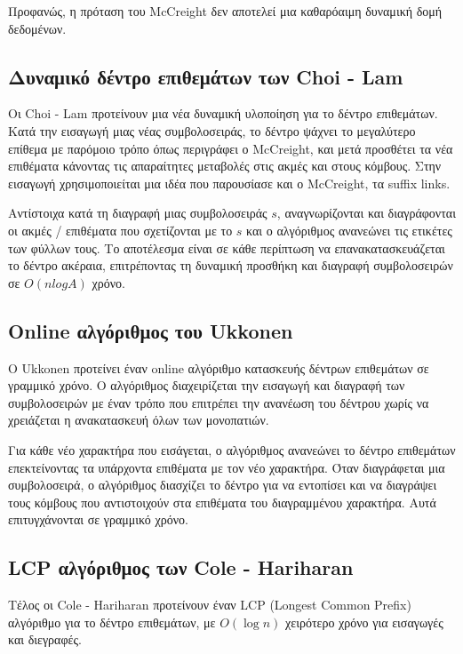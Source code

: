             Προφανώς, η πρόταση του McCreight δεν αποτελεί μια καθαρόαιμη δυναμική δομή δεδομένων.

        \subsection{Δυναμικό δέντρο επιθεμάτων των Choi - Lam}
            Οι Choi - Lam προτείνουν μια νέα δυναμική υλοποίηση για το δέντρο επιθεμάτων. \cite{Choi_Lam_1997}
            Κατά την εισαγωγή μιας νέας συμβολοσειράς, το δέντρο ψάχνει το μεγαλύτερο επίθεμα με παρόμοιο τρόπο όπως περιγράφει ο McCreight, και μετά προσθέτει τα νέα επιθέματα κάνοντας τις απαραίτητες μεταβολές στις ακμές και στους κόμβους.
            Στην εισαγωγή χρησιμοποιείται μια ιδέα που παρουσίασε και ο McCreight, τα suffix links.

            Αντίστοιχα κατά τη διαγραφή μιας συμβολοσειράς \(s\), αναγνωρίζονται και διαγράφονται οι ακμές / επιθέματα που σχετίζονται με το \(s\) και ο αλγόριθμος ανανεώνει τις ετικέτες των φύλλων τους.
            Το αποτέλεσμα είναι σε κάθε περίπτωση να επανακατασκευάζεται το δέντρο ακέραια, επιτρέποντας τη δυναμική προσθήκη και διαγραφή συμβολοσειρών σε \(O(nlogA)\) χρόνο.

        \subsection{Online αλγόριθμος του Ukkonen}
            O Ukkonen προτείνει έναν online αλγόριθμο κατασκευής δέντρων επιθεμάτων σε γραμμικό χρόνο. \cite{Ukkonen_1995}
            Ο αλγόριθμος διαχειρίζεται την εισαγωγή και διαγραφή των συμβολοσειρών με έναν τρόπο που επιτρέπει την ανανέωση του δέντρου χωρίς να χρειάζεται η ανακατασκευή όλων των μονοπατιών.

            Για κάθε νέο χαρακτήρα που εισάγεται, ο αλγόριθμος ανανεώνει το δέντρο επιθεμάτων επεκτείνοντας τα υπάρχοντα επιθέματα με τον νέο χαρακτήρα.
            Όταν διαγράφεται μια συμβολοσειρά, ο αλγόριθμος διασχίζει το δέντρο για να εντοπίσει και να διαγράψει τους κόμβους που αντιστοιχούν στα επιθέματα του διαγραμμένου χαρακτήρα.
            Αυτά επιτυγχάνονται σε γραμμικό χρόνο.

        \subsection{LCP αλγόριθμος των Cole - Hariharan}
            Τέλος οι Cole - Hariharan προτείνουν έναν LCP (Longest Common Prefix) αλγόριθμο για το δέντρο επιθεμάτων, με \(O(\log n)\) χειρότερο χρόνο για εισαγωγές και διεγραφές. \cite{Cole_Hariharan_2005}
